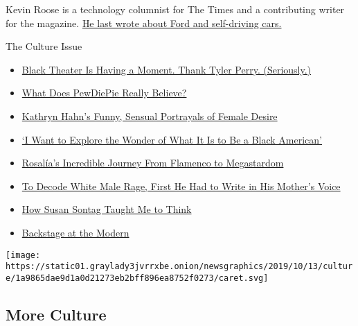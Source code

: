 Kevin Roose is a technology columnist for The Times and a contributing
writer for the magazine.
\href{https://www.nytimes3xbfgragh.onion/interactive/2017/11/09/magazine/tech-design-autonomous-future-cars-detroit-ford.html}{He
last wrote about Ford and self-driving cars.}

The Culture Issue

\begin{itemize}
\tightlist
\item
  \href{https://www.nytimes3xbfgragh.onion/interactive/2019/10/09/magazine/tyler-perry-black-theater.html}{Black
  Theater Is Having a Moment. Thank Tyler Perry. (Seriously.)}
\item
  \href{https://www.nytimes3xbfgragh.onion/interactive/2019/10/09/magazine/PewDiePie-interview.html}{What
  Does PewDiePie Really Believe?}
\item
  \href{https://www.nytimes3xbfgragh.onion/interactive/2019/10/09/magazine/kathryn-hahn-mrs-fletcher.html}{Kathryn
  Hahn's Funny, Sensual Portrayals of Female Desire}
\item
  \href{https://www.nytimes3xbfgragh.onion/interactive/2019/10/08/magazine/black-women-artists-conversation.html}{`I
  Want to Explore the Wonder of What It Is to Be a Black American'}
\item
  \href{https://www.nytimes3xbfgragh.onion/interactive/2019/10/08/magazine/rosalia-flamenco.html}{Rosalía's
  Incredible Journey From Flamenco to Megastardom}
\item
  \href{https://www.nytimes3xbfgragh.onion/interactive/2019/10/08/magazine/ben-lerner-topeka-school.html}{To
  Decode White Male Rage, First He Had to Write in His Mother's Voice}
\item
  \href{https://www.nytimes3xbfgragh.onion/interactive/2019/10/08/magazine/susan-sontag.html}{How
  Susan Sontag Taught Me to Think}
\item
  \href{https://www.nytimes3xbfgragh.onion/interactive/2019/10/09/magazine/moma-reopening.html}{Backstage
  at the Modern}
\end{itemize}

\protect\hyperlink{}{} \protect\hyperlink{}{}

\texttt{[image: https://static01.graylady3jvrrxbe.onion/newsgraphics/2019/10/13/culture/1a9865dae9d1a0d21273eb2bff896ea8752f0273/caret.svg]}

\hypertarget{more-culture}{%
\subsection{More Culture}\label{more-culture}}

